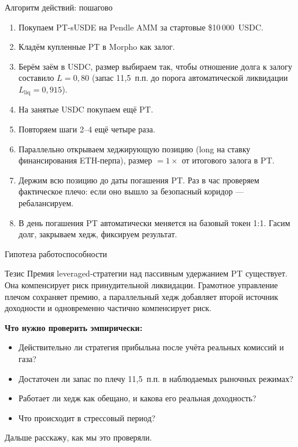 \documentclass[11pt,aspectratio=169]{beamer}
\begin{document}
\begin{frame}{Алгоритм действий: пошагово}
  \footnotesize
  \begin{enumerate}\itemsep0.3em
    \item Покупаем PT-sUSDE на Pendle AMM за стартовые \$10\,000~USDC.
    \item Кладём купленные PT в Morpho как залог.
    \item Берём заём в USDC, размер выбираем так, чтобы отношение долга к
          залогу составило $L = 0{,}80$ (запас 11{,}5~п.п. до порога автоматической
          ликвидации $L_{\text{liq}} = 0{,}915$).
    \item На занятые USDC покупаем ещё PT.
    \item Повторяем шаги 2--4 ещё четыре раза.
    \item Параллельно открываем хеджирующую позицию (long на ставку
          финансирования ETH-перпа), размер $= 1\times$ от итогового
          залога в PT.
    \item Держим всю позицию до даты погашения PT. Раз в час проверяем
          фактическое плечо: если оно вышло за безопасный коридор --- ребалансируем.
    \item В день погашения PT автоматически меняется на базовый токен 1:1.
          Гасим долг, закрываем хедж, фиксируем результат.
  \end{enumerate}
\end{frame}

\begin{frame}{Гипотеза работоспособности}
  \begin{block}{Тезис}
    Премия leveraged-стратегии над пассивным удержанием PT существует.
    Она компенсирует риск принудительной ликвидации. Грамотное управление
    плечом сохраняет премию, а параллельный хедж добавляет второй
    источник доходности и одновременно частично компенсирует риск.
  \end{block}

  \vspace{0.4em}
  \textbf{Что нужно проверить эмпирически:}
  \begin{itemize}\itemsep0.2em
    \item Действительно ли стратегия прибыльна после учёта реальных
          комиссий и газа?
    \item Достаточен ли запас по плечу 11{,}5~п.п. в наблюдаемых
          рыночных режимах?
    \item Работает ли хедж как обещано, и какова его реальная
          доходность?
    \item Что происходит в стрессовый период?
  \end{itemize}

  \vspace{0.4em}
  Дальше расскажу, как мы это проверяли.
\end{frame}
\end{document}

